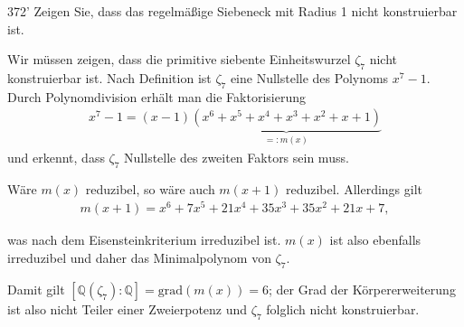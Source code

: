 \begin{algebraUE}{372'}
Zeigen Sie, dass das regelmäßige Siebeneck mit Radius 1 nicht konstruierbar ist.
\end{algebraUE}

\begin{solution}
  Wir müssen zeigen, dass die primitive siebente Einheitswurzel $\zeta_7$ nicht konstruierbar ist. Nach Definition ist $\zeta_7$ eine Nullstelle des Polynoms $x^7-1.$ Durch Polynomdivision erhält man die Faktorisierung
  \begin{align}
      x^7-1 = (x-1)\underbrace{(x^6+x^5+x^4+x^3+x^2+x+1)}_{=: m(x)}
  \end{align}
  und erkennt, dass $\zeta_7$ Nullstelle des zweiten Faktors sein muss.

  Wäre $m(x)$ reduzibel, so wäre auch $m(x+1)$ reduzibel. Allerdings gilt
  \begin{align}
      m(x+1) = x^6+7x^5+21x^4+35x^3+35x^2+21x+7,
  \end{align}

  was nach dem Eisensteinkriterium irreduzibel ist. $m(x)$ ist also ebenfalls irreduzibel und daher das Minimalpolynom von $\zeta_7.$

  Damit gilt $[\mathbb{Q}(\zeta_7):\mathbb{Q}] = \mathrm{grad}(m(x)) = 6$; der Grad der Körpererweiterung ist also nicht Teiler einer Zweierpotenz und $\zeta_7$ folglich nicht konstruierbar.
\end{solution}
